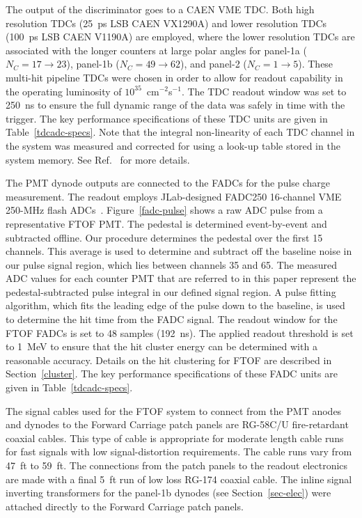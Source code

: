 \documentclass[final,3p,twocolumn]{elsarticle}
\begin{document}
The output of the discriminator goes to a CAEN VME TDC. Both high resolution TDCs (25~ps LSB CAEN
VX1290A) and lower resolution TDCs (100~ps LSB CAEN V1190A) are employed, where the lower resolution
TDCs are associated with the longer counters at large polar angles for panel-1a ($N_C = 17 \to 23$), panel-1b
($N_C = 49 \to 62$), and panel-2 ($N_C = 1 \to 5$). These multi-hit pipeline TDCs were chosen in order to
allow for readout capability in the operating luminosity of $10^{35}$~cm$^{-2}$s$^{-1}$. The TDC readout window
was set to 250~ns to ensure the full dynamic range of the data was safely in time with the trigger. The key
performance specifications of these TDC units are given in Table~\ref{tdcadc-specs}. Note that the integral
non-linearity of each TDC channel in the system was measured and corrected for using a look-up table stored in
the system memory. See Ref.~\cite{daq-nim} for more details.

The PMT dynode outputs are connected to the FADCs for the pulse charge measurement. The readout
employs JLab-designed FADC250 16-channel VME 250-MHz flash ADCs~\cite{fadc-manual}. 
Figure~\ref{fadc-pulse} shows a raw ADC pulse from a representative FTOF PMT. The pedestal is determined
event-by-event and subtracted offline. Our procedure determines the pedestal over the first 15 channels. This
average is used to determine and subtract off the baseline noise in our pulse signal region, which lies between
channels 35 and 65. The measured ADC values for each counter PMT that are referred to in this paper represent
the pedestal-subtracted pulse integral in our defined signal region. A pulse fitting algorithm, which fits the leading
edge of the pulse down to the baseline, is used to determine the hit time from the FADC signal. The readout window
for the FTOF FADCs is set to 48 samples (192~ns). The applied readout threshold is set to 1~MeV to ensure that
the hit cluster energy can be determined with a reasonable accuracy. Details on the hit clustering for FTOF are
described in Section~\ref{cluster}. The key performance specifications of these FADC units are given in
Table~\ref{tdcadc-specs}.

The signal cables used for the FTOF system to connect from the PMT anodes and dynodes to the Forward
Carriage patch panels are RG-58C/U fire-retardant coaxial cables. This type of cable is appropriate for
moderate length cable runs for fast signals with low signal-distortion requirements. The cable runs vary
from 47~ft to 59~ft. The connections from the patch panels to the readout electronics are made with a
final 5~ft run of low loss RG-174 coaxial cable. The inline signal inverting transformers for the panel-1b
dynodes (see Section~\ref{sec-elec}) were attached directly to the Forward Carriage patch panels.
\end{document}
